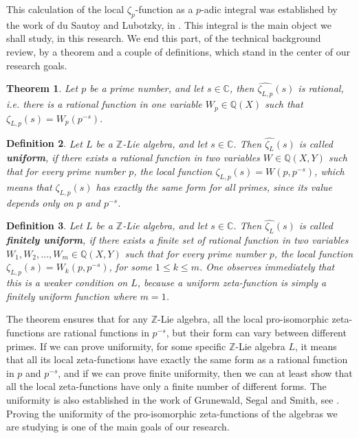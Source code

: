 \documentclass[12pt]{article}
\newtheorem{theorem}{Theorem}[subsection]
\newtheorem{definition}[theorem]{Definition}
\begin{document}
This calculation of the local $\zeta_p$-function as a $p$-adic integral was established by the work of du Sautoy and Lubotzky, in \cite{DuSautoyLubotzky}.
This integral is the main object we shall study, in this research.
We end this part, of the technical background review, by a theorem and a couple of definitions, which stand in the center of our research goals.
\begin{theorem}
\label{thm.rational.function}
Let $p$ be a prime number, and let $s\in\mathbb{C}$, then $\hat{\zeta_{L,p}}(s)$ is rational, i.e. there is a rational function in one variable $W_p\in\mathbb{Q}(X)$ such that $\zeta_{L,p}(s)=W_p(p^{-s})$.
\end{theorem}
\begin{definition}
\label{def.uniform}
Let $L$ be a $\mathbb{Z}$-Lie algebra, and let $s\in\mathbb{C}$. Then $\hat{\zeta_L}(s)$ is called \textbf{uniform}, if there exists a rational function in two variables $W\in\mathbb{Q}(X,Y)$ such that for every prime number $p$, the local function $\zeta_{L,p}(s)=W(p,p^{-s})$, which means that $\zeta_{L,p}(s)$ has exactly the same form for all primes, since its value depends only on $p$ and $p^{-s}$.
\end{definition}
\begin{definition}
\label{def.finitely.uniform}
Let $L$ be a $\mathbb{Z}$-Lie algebra, and let $s\in\mathbb{C}$. Then $\hat{\zeta_L}(s)$ is called \textbf{ finitely uniform}, if there exists a finite set of rational function in two variables $W_1,W_2,\dots,W_m\in\mathbb{Q}(X,Y)$ such that for every prime number $p$, the local function $\zeta_{L,p}(s)=W_k(p,p^{-s})$, for some $1\leq k\leq m$. One observes immediately that this is a weaker condition on $L$, because a uniform zeta-function is simply a finitely uniform function where $m=1$.
\end{definition}
The theorem ensures that for any $\mathbb{Z}$-Lie algebra, all the local pro-isomorphic zeta-functions are rational functions in $p^{-s}$, but their form can vary between different primes. If we can prove uniformity, for some specific $\mathbb{Z}$-Lie algebra $L$, it means that all its local zeta-functions have exactly the same form as a rational function in $p$ and $p^{-s}$, and if we can prove finite uniformity, then we can at least show that all the local zeta-functions have only a finite number of different forms.
The uniformity is also established in the work of Grunewald, Segal and Smith, see \cite{GrunewaldSegalSmith}.
Proving the uniformity of the pro-isomorphic zeta-functions of the algebras we are studying is one of the main goals of our research.
\end{document}
